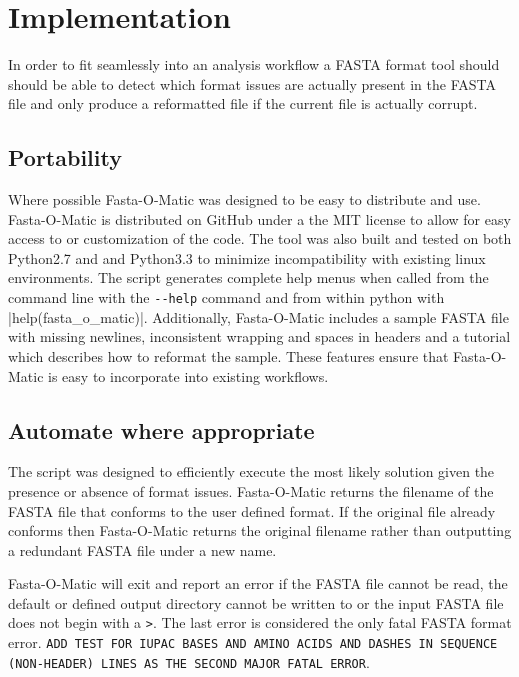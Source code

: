 \section{Implementation}

In order to fit seamlessly into an analysis workflow a FASTA format tool should should be able to detect which format issues are actually present in the FASTA file and only produce a reformatted file if the current file is actually corrupt. 


\subsection{Portability}

Where possible Fasta-O-Matic was designed to be easy to distribute and use. Fasta-O-Matic is distributed on GitHub under a the MIT license to allow for easy access to or customization of the code. The tool was also built and tested on both Python2.7 and and Python3.3 to minimize incompatibility with existing linux environments. The script generates complete help menus when called from the command line with the \verb|--help| command and from within python with \ver|help(fasta_o_matic)|. Additionally, Fasta-O-Matic includes a sample FASTA file with missing newlines, inconsistent wrapping and spaces in headers and a tutorial which describes how to reformat the sample. These features ensure that Fasta-O-Matic is easy to incorporate into existing workflows.

\subsection{Automate where appropriate} 

The script was designed to efficiently execute the most likely solution given the presence or absence of format issues. Fasta-O-Matic returns the filename of the FASTA file that conforms to the user defined format. If the original file already conforms then Fasta-O-Matic returns the original filename rather than outputting a redundant FASTA file under a new name.

Fasta-O-Matic will exit and report an error if the FASTA file cannot be read, the default or defined output directory cannot be written to or the input FASTA file does not begin with a \verb|>|. The last error is considered the only fatal FASTA format error. \verb|ADD TEST FOR IUPAC BASES AND AMINO ACIDS AND DASHES IN SEQUENCE (NON-HEADER) LINES AS THE SECOND MAJOR FATAL ERROR|.

